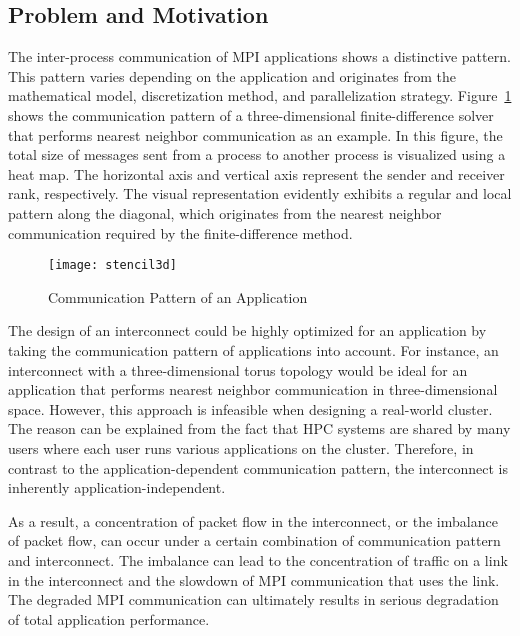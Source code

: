 \subsection{Problem and Motivation}\label{sec:i-problem}

The inter-process communication of MPI applications shows a distinctive
pattern. This pattern varies depending on the application and originates from
the mathematical model, discretization method, and parallelization strategy.
Figure~\ref{fig:stencil3d} shows the communication pattern of a
three-dimensional finite-difference solver that performs nearest neighbor
communication as an example. In this figure, the total size of messages sent
from a process to another process is visualized using a heat map. The
horizontal axis and vertical axis represent the sender and receiver rank,
respectively. The visual representation evidently exhibits a regular and local
pattern along the diagonal, which originates from the nearest neighbor
communication required by the finite-difference method.

\begin{figure}
    \centering
    \texttt{[image: stencil3d]}
    \caption{Communication Pattern of an Application}%
    \label{fig:stencil3d}
\end{figure}

The design of an interconnect could be highly optimized for an
application by taking the communication pattern of applications into account.
For instance, an interconnect with a three-dimensional torus topology would be
ideal for an application that performs nearest neighbor communication in
three-dimensional space. However, this approach is infeasible when designing a
real-world cluster. The reason can be explained from the fact that HPC systems
are shared by many users where each user runs various applications on the
cluster. Therefore, in contrast to the application-dependent communication
pattern, the interconnect is inherently application-independent.

As a result, a concentration of packet flow in the interconnect, or the
imbalance of packet flow, can occur under a certain combination of
communication pattern and interconnect. The imbalance can lead to the
concentration of traffic on a link in the interconnect and the slowdown of MPI
communication that uses the link. The degraded MPI communication can
ultimately results in serious degradation of total application performance.

